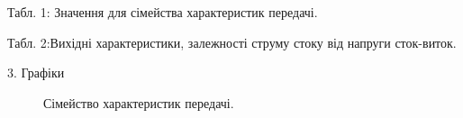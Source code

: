 \documentclass[a4paper,14pt]{extreport}
\begin{document}
\newpage



\begin{landscape}
  \begin{center}Табл. 1: Значення для сімейства характеристик передачі.\end{center}
  \begin{figure}[h]

  \end{figure}
\newpage
  \begin{center}Табл. 2:Вихідні характеристики, залежності струму стоку від напруги сток-виток.\end{center}
  \begin{figure}[h]
  \end{figure}
\end{landscape}


\newpage
\clearpage

\begin{center}3.  Графіки\\ \end{center}
\begin{figure}[h]
\caption{Сімейство характеристик передачі.}
\label{ris2}
\end{figure}
\end{document}
